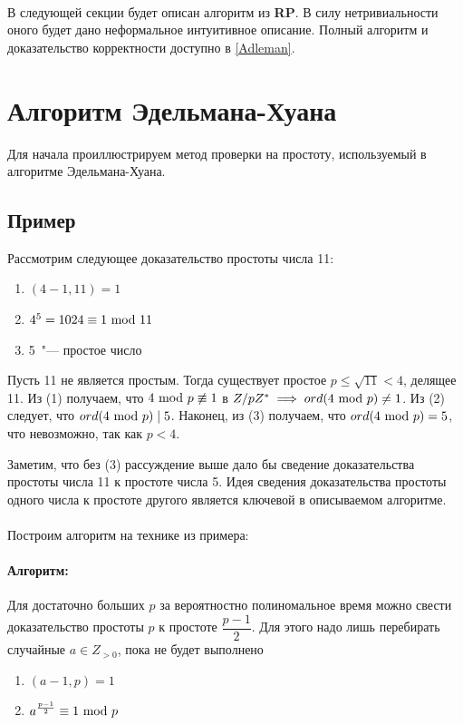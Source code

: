 \documentclass[12pt]{article}
\theoremstyle{definition}
\numberwithin{Def}{section}
\numberwithin{Th}{section}
\numberwithin{St}{section}
\numberwithin{Cor}{section}
\begin{document}
\paragraph{}В следующей секции будет описан алгоритм из \textbf{RP}. В силу
нетривиальности оного будет дано неформальное интуитивное описание. Полный
алгоритм и доказательство корректности доступно в \ref{Adleman}.

\section{Алгоритм Эдельмана-Хуана}

Для начала проиллюстрируем метод проверки на простоту, используемый в алгоритме
Эдельмана-Хуана.

\subsection{Пример}

Рассмотрим следующее доказательство простоты числа 11:
\begin{enumerate}[(1)]
	\item $(4-1,11)=1$
	\item $4^5=1024\equiv1\ \mathrm{mod}\ 11$
	\item 5~"--- простое число
\end{enumerate}
Пусть 11 не является простым. Тогда существует простое $p\leqslant\sqrt{11}<4$,
делящее 11. Из (1) получаем, что
$4\ \mathrm{mod}\ p\not\equiv1$ в $Z/pZ^*\implies ord(4\ \mathrm{mod}\ p)\neq 1$. Из (2) следует,
что $ord(4\ \mathrm{mod}\ p)\mid 5$. Наконец, из (3) получаем, что $ord(4\ \mathrm{mod}\ p)=5$,
что невозможно, так как $p<4$.

Заметим, что без (3) рассуждение выше дало бы сведение доказательства простоты
числа 11 к простоте числа 5. Идея сведения доказательства простоты одного числа
к простоте другого является ключевой в описываемом алгоритме.

\paragraph{}Построим алгоритм на технике из примера:

\paragraph{Алгоритм:} Для достаточно больших $p$ за
вероятностно полиномальное время можно свести
доказательство простоты $p$ к простоте $\dfrac{p-1}2$. Для этого надо лишь
перебирать случайные $a\in Z_{>0}$, пока не будет выполнено
\begin{enumerate}[(1)]
	\item $(a-1,p)=1$
	\item $a^{\frac{p-1}2}\equiv1\ \mathrm{mod}\ p$
\end{enumerate}
\end{document}
